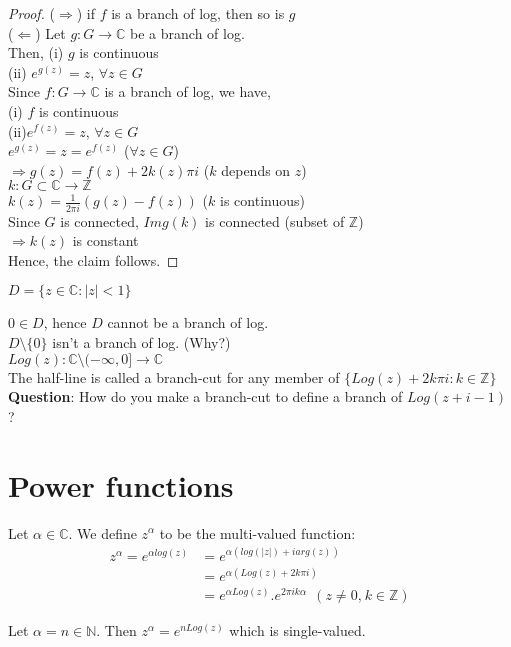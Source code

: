 \begin{proof}
($\Rightarrow$) if $f$ is a branch of log, then so is $g$\\
($\Leftarrow$) Let $g:G\rightarrow \mathds{C}$ be a branch of log. \\
Then, (i) $g$ is continuous\\
(ii) $e^{g(z)}=z$, $\forall z\in G$\\
Since $f:G\rightarrow \mathds{C}$ is a branch of log, we have, \\
(i) $f$ is continuous \\
(ii)$e^{f(z)}=z$, $\forall z\in G$\\
$e^{g(z)}=z=e^{f(z)}$ ($\forall z\in G$)\\
$\Rightarrow g(z)=f(z)+ 2k(z)\pi i$ ($k$ depends on $z$)\\
$k: G\subset \mathds{C}\rightarrow \mathds{Z}$\\
$k(z)=\frac{1}{2\pi i}(g(z)-f(z))$ ($k$ is continuous)\\
Since $G$ is connected, $Img(k)$ is connected  (subset of $\mathds{Z}$)\\
$\Rightarrow k(z)$ is constant \\
Hence, the claim follows.
\end{proof}
\begin{defn}
$D=\{z\in \mathds{C}: |z|< 1\}$
\end{defn}
$0\in D$, hence $D$ cannot be a branch of log. \\
$D\setminus \{0\}$ isn't a branch of log. (Why?)\\
$Log(z): \mathds{C}\setminus (-\infty,0]\rightarrow \mathds{C}$\\
The half-line is called a branch-cut for any member of $\{Log(z)+2k\pi i: k\in \mathds{Z}\}$\\
\textbf{Question}: How do you make a branch-cut to define a branch of $Log(z+i-1)$?
\section{\textbf{Power functions}}
\begin{defn}
Let $\alpha \in \mathds{C}$. We define $z^{\alpha}$ to be the multi-valued function:
\begin{align} 
z^{\alpha}=e^{\alpha log(z)}&= e^{\alpha(log(|z|)+ iarg(z))}\nonumber\\
&= e^{\alpha(Log(z)+2k\pi i)}\nonumber\\
&=e^{\alpha Log(z)}.e^{2\pi ik\alpha} \:\:(z\neq 0\text{,} \:k\in \mathds{Z})\nonumber
\end{align}
\end{defn}
Let $\alpha=n \in \mathds{N}$. Then $z^{\alpha}=e^{nLog(z)}$ which is single-valued.